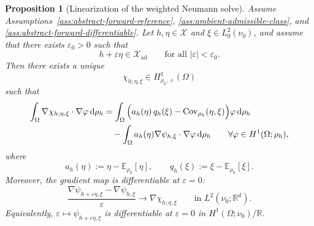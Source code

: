 \documentclass{article}
\newtheorem{proposition}[theorem]{Proposition}
\theoremstyle{definition}
\renewcommand{\d}{\mathrm{d}}
\begin{document}
\begin{proposition}[Linearization of the weighted Neumann solve]
    \label{prop:linearized-neumann}
    Assume Assumptions~\ref{ass:abstract-forward-reference},
    \ref{ass:ambient-admissible-class}, and
    \ref{ass:abstract-forward-differentiable}. Let \(h,\eta\in \mathcal X\) and
    \(\xi\in L^2_0(\nu_0)\), and assume that there exists \(\varepsilon_0>0\) such that
    \[
        h+\varepsilon \eta \in \mathcal X_{\mathrm{ad}}
        \qquad\text{for all } |\varepsilon|<\varepsilon_0.
    \]
    Then there exists a unique
    \[
        \chi_{h;\eta,\xi}\in H^1_{\rho_h,\diamond}(\Omega)
    \]
    such that
    \begin{align}
        \label{eq:linearized-neumann}
        \int_\Omega \nabla \chi_{h;\eta,\xi}\cdot \nabla \varphi\, \d\rho_h
         & =
        \int_\Omega
        \Big(
        a_h(\eta)\,q_h(\xi)
        -
        \operatorname{Cov}_{\rho_h}(\eta,\xi)
        \Big)\varphi\, \d\rho_h \notag \\
         & \quad
        -
        \int_\Omega
        a_h(\eta)
        \nabla \psi_{h,\xi}\cdot \nabla \varphi\, \d\rho_h
        \qquad
        \forall \varphi\in H^1(\Omega;\rho_h),
    \end{align}
    where
    \[
        a_h(\eta):=\eta-\mathbb E_{\rho_h}[\eta],
        \qquad
        q_h(\xi):=\xi-\mathbb E_{\rho_h}[\xi].
    \]
    Moreover, the gradient map is differentiable at \(\varepsilon=0\):
    \[
        \frac{\nabla\psi_{h+\varepsilon\eta,\xi}-\nabla\psi_{h,\xi}}{\varepsilon}
        \longrightarrow
        \nabla\chi_{h;\eta,\xi}
        \qquad\text{in } L^2(\nu_0;\mathbb R^d).
    \]
    Equivalently, \(\varepsilon\mapsto\psi_{h+\varepsilon\eta,\xi}\) is differentiable at
    \(\varepsilon=0\) in \(H^1(\Omega;\nu_0)/\mathbb R\).
\end{proposition}
\end{document}

